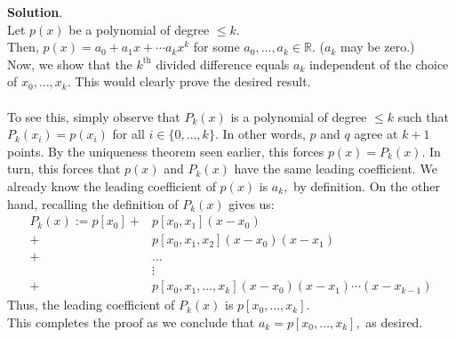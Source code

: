 \documentclass{article}
\begin{document}
\textbf{Solution}.\\
Let $p(x)$ be a polynomial of degree $\le k.$\\
Then, $p(x) = a_0 + a_1x + \cdots a_{k}x^k$ for some $a_0, \ldots, a_k \in \mathbb{R}.$ \hfill ($a_k$ may be zero.)\\
Now, we show that the $k^{\text{th}}$ divided difference equals $a_k$ independent of the choice of $x_0, \ldots, x_k.$ This would clearly prove the desired result.\\~\\
To see this, simply observe that $P_k(x)$ is a polynomial of degree $\le k$ such that $P_k(x_i) = p(x_i)$ for all $i \in \{0, \ldots, k\}.$ In other words, $p$ and $q$ agree at $k+1$ points. By the uniqueness theorem seen earlier, this forces $p(x) = P_k(x).$ In turn, this forces that $p(x)$ and $P_k(x)$ have the same leading coefficient. We already know the leading coefficient of $p(x)$ is $a_k,$ by definition. On the other hand, recalling the definition of $P_k(x)$ gives us:\\
\begin{align*} 
		P_k(x) := p[x_0]  +& p[x_0, x_1](x - x_0)\\
						 +& p[x_0, x_1, x_2](x - x_0)(x - x_1)\\
						 +& \ldots\\
						  &\vdots\\
						 +& p[x_0, x_1, \ldots, x_k](x - x_0)(x - x_1)\cdots(x - x_{k-1})
	\end{align*}
	Thus, the leading coefficient of $P_k(x)$ is $p[x_0, \ldots, x_k].$\\
	This completes the proof as we conclude that $a_k = p[x_0, \ldots, x_k],$ as desired.
\end{document}
